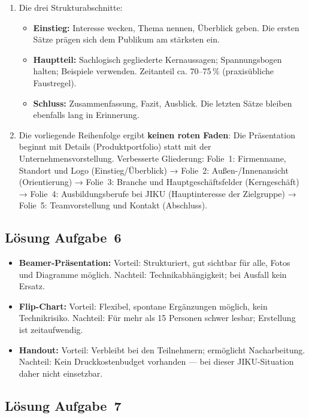 \documentclass[11pt, a4paper]{article}
\begin{document}
\begin{enumerate}[label=(\alph*)]
  \item Die drei Strukturabschnitte:
  \begin{itemize}
    \item \textbf{Einstieg:} Interesse wecken, Thema nennen, Überblick geben. Die ersten Sätze prägen sich dem Publikum am stärksten ein.
    \item \textbf{Hauptteil:} Sachlogisch gegliederte Kernaussagen; Spannungsbogen halten; Beispiele verwenden. Zeitanteil ca. 70--75\,\% (praxisübliche Faustregel).
    \item \textbf{Schluss:} Zusammenfassung, Fazit, Ausblick. Die letzten Sätze bleiben ebenfalls lang in Erinnerung.
  \end{itemize}

  \item Die vorliegende Reihenfolge ergibt \textbf{keinen roten Faden}: Die Präsentation beginnt mit Details (Produktportfolio) statt mit der Unternehmensvorstellung. Verbesserte Gliederung: Folie~1: Firmenname, Standort und Logo (Einstieg/Überblick) → Folie~2: Außen-/Innenansicht (Orientierung) → Folie~3: Branche und Hauptgeschäftsfelder (Kerngeschäft) → Folie~4: Ausbildungsberufe bei JIKU (Hauptinteresse der Zielgruppe) → Folie~5: Teamvorstellung und Kontakt (Abschluss).
\end{enumerate}

\subsection*{Lösung Aufgabe~6}

\begin{itemize}
  \item \textbf{Beamer-Präsentation:} Vorteil: Strukturiert, gut sichtbar für alle, Fotos und Diagramme möglich. Nachteil: Technikabhängigkeit; bei Ausfall kein Ersatz.
  \item \textbf{Flip-Chart:} Vorteil: Flexibel, spontane Ergänzungen möglich, kein Technikrisiko. Nachteil: Für mehr als 15 Personen schwer lesbar; Erstellung ist zeitaufwendig.
  \item \textbf{Handout:} Vorteil: Verbleibt bei den Teilnehmern; ermöglicht Nacharbeitung. Nachteil: Kein Druckkostenbudget vorhanden --- bei dieser JIKU-Situation daher nicht einsetzbar.
\end{itemize}

\subsection*{Lösung Aufgabe~7}
\end{document}
